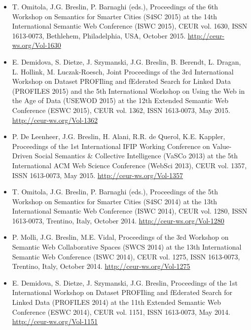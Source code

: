 \documentclass[10pt,a4paper]{res} %
\begin{document}
\begin{resume}
\begin{itemize}
\item T. Omitola, J.G. Breslin, P. Barnaghi (eds.), Proceedings of the 6th Workshop on Semantics for Smarter Cities (S4SC 2015) at the 14th International Semantic Web Conference (ISWC 2015), CEUR vol. 1630, ISSN 1613-0073, Bethlehem, Philadelphia, USA, October 2015. \url{http://ceur-ws.org/Vol-1630}
\item E. Demidova, S. Dietze, J. Szymanski, J.G. Breslin, B. Berendt, L. Dragan, L. Hollink, M. Luczak-Roesch, Joint Proceedings of the 3rd International Workshop on Dataset PROFIling and fEderated Search for Linked Data (PROFILES 2015) and the 5th International Workshop on Using the Web in the Age of Data (USEWOD 2015) at the 12th Extended Semantic Web Conference (ESWC 2015), CEUR vol. 1362, ISSN 1613-0073, May 2015. \url{http://ceur-ws.org/Vol-1362}
\item P. De Leenheer, J.G. Breslin, H. Alani, R.R. de Querol, K.E. Kappler, Proceedings of the 1st International IFIP Working Conference on Value-Driven Social Semantics \& Collective Intelligence (VaSCo 2013) at the 5th International ACM Web Science Conference (WebSci 2013), CEUR vol. 1357, ISSN 1613-0073, May 2015. \url{http://ceur-ws.org/Vol-1357}
\item T. Omitola, J.G. Breslin, P. Barnaghi (eds.), Proceedings of the 5th Workshop on Semantics for Smarter Cities (S4SC 2014) at the 13th International Semantic Web Conference (ISWC 2014), CEUR vol. 1280, ISSN 1613-0073, Trentino, Italy, October 2014. \url{http://ceur-ws.org/Vol-1280}
\item P. Molli, J.G. Breslin, M.E. Vidal, Proceedings of the 3rd Workshop on Semantic Web Collaborative Spaces (SWCS 2014) at the 13th International Semantic Web Conference (ISWC 2014), CEUR vol. 1275, ISSN 1613-0073, Trentino, Italy, October 2014.  \url{http://ceur-ws.org/Vol-1275}
\item E. Demidova, S. Dietze, J. Szymanski, J.G. Breslin, Proceedings of the 1st International Workshop on Dataset PROFIling and fEderated Search for Linked Data (PROFILES 2014) at the 11th Extended Semantic Web Conference (ESWC 2014), CEUR vol. 1151, ISSN 1613-0073, May 2014. \url{http://ceur-ws.org/Vol-1151}

\end{itemize}
\end{resume}
\end{document}
